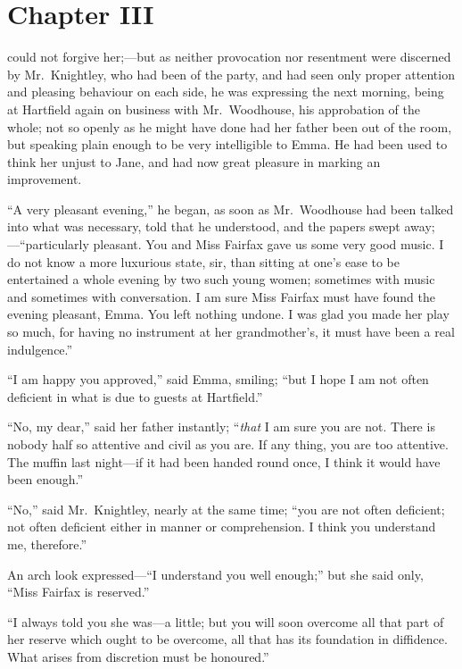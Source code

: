 \chapter{Chapter III}


 could not forgive her;---but as neither provocation nor resentment
were discerned by Mr.\ Knightley, who had been of the party, and had
seen only proper attention and pleasing behaviour on each side,
he was expressing the next morning, being at Hartfield again on
business with Mr.\ Woodhouse, his approbation of the whole; not so
openly as he might have done had her father been out of the room,
but speaking plain enough to be very intelligible to Emma.
He had been used to think her unjust to Jane, and had now great
pleasure in marking an improvement.

``A very pleasant evening,'' he began, as soon as Mr.\ Woodhouse
had been talked into what was necessary, told that he understood,
and the papers swept away;---``particularly pleasant.  You and Miss
Fairfax gave us some very good music.  I do not know a more
luxurious state, sir, than sitting at one's ease to be entertained
a whole evening by two such young women; sometimes with music
and sometimes with conversation.  I am sure Miss Fairfax must
have found the evening pleasant, Emma.  You left nothing undone.
I was glad you made her play so much, for having no instrument
at her grandmother's, it must have been a real indulgence.''

``I am happy you approved,'' said Emma, smiling; ``but I hope I am
not often deficient in what is due to guests at Hartfield.''

``No, my dear,'' said her father instantly; ``\emph{that} I am sure you
are not.  There is nobody half so attentive and civil as you are.
If any thing, you are too attentive.  The muffin last night---if it
had been handed round once, I think it would have been enough.''

``No,'' said Mr.\ Knightley, nearly at the same time; ``you are not
often deficient; not often deficient either in manner or comprehension.
I think you understand me, therefore.''

An arch look expressed---``I understand you well enough;'' but she
said only, ``Miss Fairfax is reserved.''

``I always told you she was---a little; but you will soon overcome
all that part of her reserve which ought to be overcome, all that
has its foundation in diffidence.  What arises from discretion
must be honoured.''

